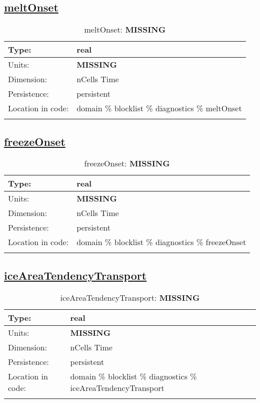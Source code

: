 \subsection[meltOnset]{\hyperref[sec:var_tab_diagnostics]{meltOnset}}
\label{subsec:var_sec_diagnostics_meltOnset}
\begin{center}
\begin{longtable}{| p{2.0in} | p{4.0in} |}
        \hline 
        Type: & real \\
        \hline 
        Units: & {\bf \color{red} MISSING} \\
        \hline 
        Dimension: & nCells Time \\
        \hline 
        Persistence: & persistent \\
        \hline 
         Location in code: & domain \% blocklist \% diagnostics \% meltOnset \\
         \hline 
    \caption{meltOnset: {\bf \color{red} MISSING}}
\end{longtable}
\end{center}
\subsection[freezeOnset]{\hyperref[sec:var_tab_diagnostics]{freezeOnset}}
\label{subsec:var_sec_diagnostics_freezeOnset}
\begin{center}
\begin{longtable}{| p{2.0in} | p{4.0in} |}
        \hline 
        Type: & real \\
        \hline 
        Units: & {\bf \color{red} MISSING} \\
        \hline 
        Dimension: & nCells Time \\
        \hline 
        Persistence: & persistent \\
        \hline 
         Location in code: & domain \% blocklist \% diagnostics \% freezeOnset \\
         \hline 
    \caption{freezeOnset: {\bf \color{red} MISSING}}
\end{longtable}
\end{center}
\subsection[iceAreaTendencyTransport]{\hyperref[sec:var_tab_diagnostics]{iceAreaTendencyTransport}}
\label{subsec:var_sec_diagnostics_iceAreaTendencyTransport}
\begin{center}
\begin{longtable}{| p{2.0in} | p{4.0in} |}
        \hline 
        Type: & real \\
        \hline 
        Units: & {\bf \color{red} MISSING} \\
        \hline 
        Dimension: & nCells Time \\
        \hline 
        Persistence: & persistent \\
        \hline 
         Location in code: & domain \% blocklist \% diagnostics \% iceAreaTendencyTransport \\
         \hline 
    \caption{iceAreaTendencyTransport: {\bf \color{red} MISSING}}
\end{longtable}
\end{center}
